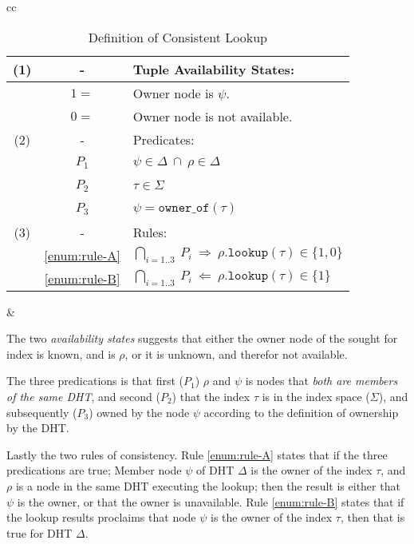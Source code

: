 \begin{table}[htp]%
\begin{center}
\begin{tabular}{cc}
\begin{tabular}{|cc|l|}                                  \hline
 (1) &  -  & Tuple Availability States:               \\ \hline
  \  &$1 =$& Owner node is $\psi$.                    \\
  \  &$0 =$& Owner node is not available.             \\ \hline\hline
 (2) &  -  & Predicates:                              \\ \hline
  \  &$P_1$& $\psi\in\Delta\ \cap\ \rho\in\Delta $   \\
  \  &$P_2$& $\tau\in\Sigma\ $  \\
  \  &$P_3$& $\psi=\mathtt{owner\_of}(\tau)$ \\ \hline\hline
 (3) &  -  & Rules:                                                  \\ \hline
  \  &\ref{enum:rule-A}&
        $\bigcap_{i=1..3}\ P_i\ \Rightarrow\ \rho.\mathtt{lookup}(\tau)\in\{1,0\}$\\
  \  &\ref{enum:rule-B}&
        $\bigcap_{i=1..3}\ P_i\ \Leftarrow\  \rho.\mathtt{lookup}(\tau)\in\{1\}$  \\
  \hline
\end{tabular}

&

\parbox{.34\linewidth}{ \small
  The two \emph{availability states} suggests that either the owner node of the
  sought for index is known, and is $\rho$, or it is unknown, and therefor
  not available.

  The three predications is that first ($P_1$) $\rho$ and $\psi$ is nodes that
  \emph{both are members of the same DHT}, and second ($P_2$) that the index
  $\tau$ is in the index space ($\Sigma$), and subsequently ($P_3$) owned by
  the node $\psi$ according to the definition of ownership by the DHT.

}

\end{tabular}

\vspace*{.06cm}
\parbox{.9\linewidth}{ \small
  Lastly the two rules of consistency. Rule \ref{enum:rule-A} states that if the three
  predications are true; Member node $\psi$ of DHT $\Delta$ is the owner of the index
  $\tau$, and $\rho$ is a node in the same DHT executing the lookup; then the result
  is either that $\psi$ is the owner, or that the owner is
  unavailable. Rule \ref{enum:rule-B} states that if the lookup results proclaims
  that node $\psi$ is the owner of the index $\tau$, then that is true for DHT $\Delta$.
}

\end{center}
\caption{Definition of Consistent Lookup}
\label{tab:consistency-definition}
\end{table}


